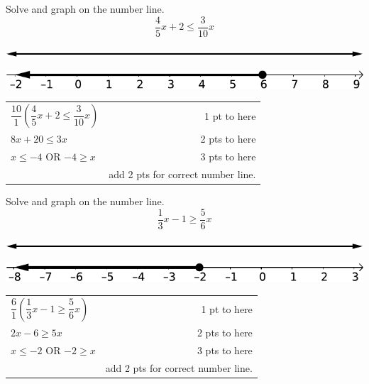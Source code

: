 {
	Solve and graph on the number line. $$\frac{4}{5}x+2 \leq \frac{3}{10}x$$\begin{onlyproblem}\begin{center}\includegraphics{numberLineNoNumbersNoTicks}\end{center}\end{onlyproblem} \begin{onlysolution}\begin{center}\includegraphics{fig095-07-5-c-answer}\end{center}\end{onlysolution}
}
{
	\begin{tabular}{l r}
	$\dfrac{10}{1}\left(\dfrac{4}{5}x+2 \leq \dfrac{3}{10}x\right)$ & 1 pt to here \\
	$8x+20\leq 3x$ & 2 pts to here \\
	$x\leq -4$ OR $-4\geq x$ & 3 pts to here \\
	 & add 2 pts for correct number line.
	\end{tabular}
}

{
	Solve and graph on the number line. $$\frac{1}{3}x-1 \geq \frac{5}{6}x$$\begin{onlyproblem}\begin{center}\includegraphics{numberLineNoNumbersNoTicks}\end{center}\end{onlyproblem} \begin{onlysolution}\begin{center}\includegraphics{fig095-07-5-d-answer}\end{center}\end{onlysolution}
}
{
	\begin{tabular}{l r}
	$\dfrac{6}{1}\left(\dfrac{1}{3}x-1 \geq \dfrac{5}{6}x\right)$ & 1 pt to here \\
	$2x-6\geq 5x$ & 2 pts to here \\
	$x\leq -2$ OR $-2\geq x$ & 3 pts to here \\
	 & add 2 pts for correct number line.
	\end{tabular}
}
